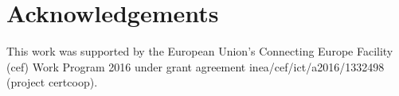 \section*{Acknowledgements}
This work was supported by the European Union's Connecting
Europe Facility ({\sc cef}) Work Program 2016 under grant agreement
{\sc inea}/{\sc cef}/{\sc ict}/{\sc a}2016/1332498 (project {\sc certcoop}).
